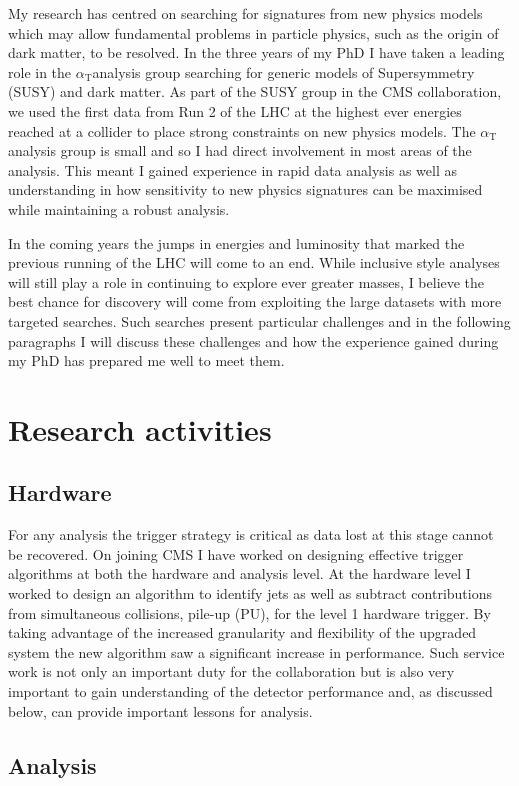 \documentclass[11pt]{article}
\theoremstyle{plain} \numberwithin{equation}{section}
\theoremstyle{definition}
\DeclareRobustCommand{\alphat}{$\alpha_{\text{T}}$}
\begin{document}
My research has centred on searching for signatures from new physics models
which may allow fundamental problems in particle physics, such as the origin of 
dark matter, to be resolved. In the three years of my PhD I have taken a 
leading role in the \alphat analysis group searching for generic models of Supersymmetry (SUSY) and dark matter. 
As part of the SUSY group in the CMS collaboration, we used the first data from Run 2 of the LHC 
at the highest ever energies reached at a collider to place strong constraints 
on new physics models. The \alphat analysis group is small and so I had direct involvement 
in most areas of the analysis. This meant I gained experience in rapid data analysis as well
as understanding in how sensitivity to new physics signatures can be maximised
while maintaining a robust analysis. 

In the coming years the jumps in energies and luminosity that marked the previous running of the 
LHC will come to an end. While inclusive style analyses will still play a role in continuing 
to explore ever greater masses, I believe the best chance for discovery will come from 
exploiting the large datasets with more targeted searches. Such searches present particular
challenges and in the following paragraphs I will discuss these challenges and how the experience 
gained during my PhD has prepared me well to meet them.

\section*{Research activities}
\subsection*{Hardware}
For any analysis the trigger strategy is critical as data lost
at this stage cannot be recovered. On joining CMS I have worked on designing effective
trigger algorithms at both the hardware and analysis level. At the hardware level
I worked to design an algorithm to identify jets as well as subtract contributions from simultaneous collisions, 
pile-up (PU), for the level 1 hardware trigger. By taking advantage of the increased granularity 
and flexibility of the upgraded system the new algorithm saw a significant increase in performance.
Such service work is not only an important duty for the collaboration but is also
very important to gain understanding of the detector performance and, as discussed below,
can provide important lessons for analysis.
\subsection*{Analysis}
\end{document}
